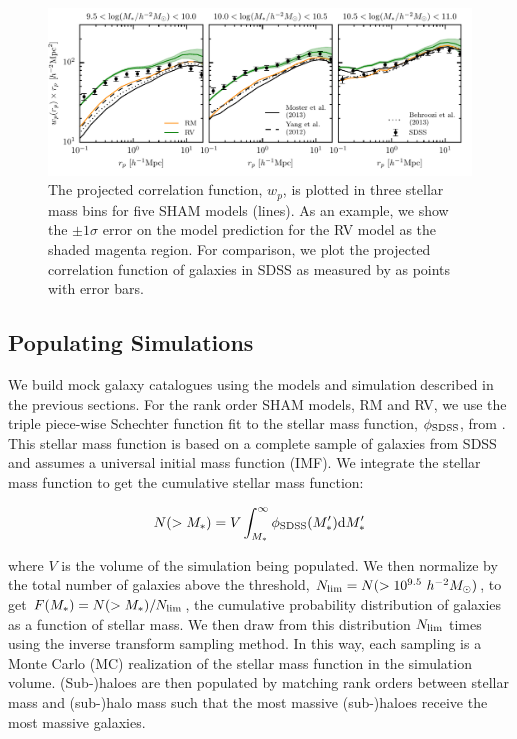 \documentclass[a4paper,fleqn,usenatbib]{mnras}
\begin{document}
\begin{figure}
    \includegraphics{figures/wp_comparison.pdf}
    \caption{The projected correlation function, $w_p$, is plotted in three stellar mass bins for five SHAM models (lines).  As an example, we show the $\pm 1\sigma$ error on the model prediction for the RV model as the shaded magenta region.  For comparison, we plot the projected correlation function of galaxies in SDSS as measured by \citet{Yang:2012ew} as points with error bars.}
    \label{fig:wp_comparison}
\end{figure}

\subsection{Populating Simulations}
\label{sec:pop}

We build mock galaxy catalogues using the models and simulation described in the previous sections.  For the rank order SHAM models, RM and RV, we use the triple piece-wise Schechter function fit to the stellar mass function, $\phi_{\rm SDSS}$, from \citet[][LW09 hereafter]{Li:2009kh}.  This stellar mass function is based on a complete sample of galaxies from SDSS and assumes a universal \citet{Chabrier:2003ki} initial mass function (IMF).  We integrate the stellar mass function to get the cumulative stellar mass function:
%
\begin{linenomath}
\begin{equation}
N(>M_*) = V\int_{M_*}^{\infty} \phi_{\rm SDSS}(M_*^{\prime}) \mathrm{d}M_*^{\prime}
\end{equation}
\end{linenomath}
%
where $V$ is the volume of the simulation being populated.  We then normalize by the total number of galaxies above the threshold, $N_{\rm lim} = N(>10^{9.5}~h^{-2}M_{\odot})$, to get $F(M_*) = N(>M_*)/N_{\rm lim}$, the cumulative probability distribution of galaxies as a function of stellar mass.  We then draw from this distribution $N_{\rm lim}$ times using the inverse transform sampling method.  In this way, each sampling is a Monte Carlo (MC) realization of the stellar mass function in the simulation volume.  (Sub-)haloes are then populated by matching rank orders between stellar mass and (sub-)halo mass such that the most massive (sub-)haloes receive the most massive galaxies.
\end{document}
